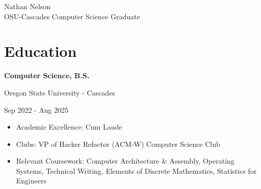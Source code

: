 \documentclass[10pt]{article}
\newcommand{\triline}[3]{%
    \parbox[t][][t]{.4\linewidth}{ #1 }%
    \parbox[t][][t]{.4\linewidth}{ #2 }%
    \parbox[t][][t]{.2\linewidth}{\raggedleft #3 }%
    \vspace{1ex}
}
\newlength{\listpostvertical}
\begin{document}
\titlespacing*{\section}{0pt}{1ex}{2ex}
\titlespacing*{\subsection}{0pt}{1ex}{2ex}

\begin{center}
{ \fontsize{0.6in}{0in}\selectfont Nathan Nelson } \\
\vspace{1ex}
{\large OSU-Cascades Computer Science Graduate} \\
\vspace{1ex}
\end{center}

\section{Education}

\triline{\textbf{Computer Science, B.S.}}{Oregon State University - Cascades}{Sep 2022 - Aug 2025}

\begin{itemize}[nosep]
\item Academic Excellence: Cum Laude
\item Clubs: VP of Hacker Refactor (ACM-W) Computer Science Club
\item Relevant Coursework: Computer Architecture \& Assembly, Operating Systems, 
    Technical Writing, Elements of Discrete Mathematics, Statistics for Engineers 

\end{itemize}
\vspace{\listpostvertical}
\end{document}
